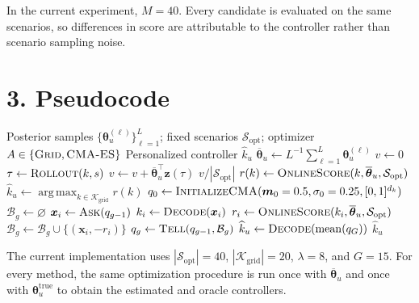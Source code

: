 \documentclass[11pt]{article}
\begin{document}
In the current experiment, $M=40$. Every candidate is evaluated on the same scenarios,
so differences in score are attributable to the controller rather than scenario sampling noise.

\section*{3. Pseudocode}

\begin{algorithm}
\caption{Online Personalized Controller Optimization}
\label{alg:online-personalized-controller}
\begin{algorithmic}[1]
\Require Posterior samples $\{\boldsymbol{\theta}_u^{(\ell)}\}_{\ell=1}^{L}$;
fixed scenarios $\mathcal{S}_{\mathrm{opt}}$;
optimizer $A\in\{\textsc{Grid},\textsc{CMA-ES}\}$
\Ensure Personalized controller $\widehat{k}_u$
\State $\overline{\boldsymbol{\theta}}_u
\gets L^{-1}\sum_{\ell=1}^{L}\boldsymbol{\theta}_u^{(\ell)}$
    \State $v\gets 0$
        \State $\tau\gets\Call{Rollout}{k,s}$
        \State $v\gets v+\overline{\boldsymbol{\theta}}_u^{\top}\boldsymbol{z}(\tau)$
    \EndFor
    \State \Return $v/|\mathcal{S}_{\mathrm{opt}}|$
\EndFunction
{}
        \State $r(k)\gets\Call{OnlineScore}{k,\overline{\boldsymbol{\theta}}_u,
        \mathcal{S}_{\mathrm{opt}}}$
    \EndFor
    \State $\widehat{k}_u\gets\operatorname*{arg\,max}_{k\in\mathcal{K}_{\mathrm{grid}}}r(k)$
    \State $q_0\gets\Call{InitializeCMA}{\boldsymbol{m}_0=0.5,\sigma_0=0.25,
    [0,1]^{d_k}}$
        \State $\mathcal{B}_g\gets\varnothing$
            \State $\boldsymbol{x}_i\gets\Call{Ask}{q_{g-1}}$
            \State $k_i\gets\Call{Decode}{\boldsymbol{x}_i}$
            \State $r_i\gets\Call{OnlineScore}{k_i,\overline{\boldsymbol{\theta}}_u,
            \mathcal{S}_{\mathrm{opt}}}$
            \State $\mathcal{B}_g\gets\mathcal{B}_g\cup\{(\boldsymbol{x}_i,-r_i)\}$
        \EndFor
        \State $q_g\gets\Call{Tell}{q_{g-1},\mathcal{B}_g}$
    \EndFor
    \State $\widehat{k}_u\gets\Call{Decode}{\operatorname{mean}(q_G)}$
\EndIf
\State \Return $\widehat{k}_u$
\end{algorithmic}
\end{algorithm}

The current implementation uses $|\mathcal{S}_{\mathrm{opt}}|=40$,
$|\mathcal{K}_{\mathrm{grid}}|=20$, $\lambda=8$, and $G=15$.
For every method, the same optimization procedure is run once with
$\overline{\boldsymbol{\theta}}_u$ and once with
$\boldsymbol{\theta}_u^{\mathrm{true}}$ to obtain the estimated and oracle controllers.
\end{document}
